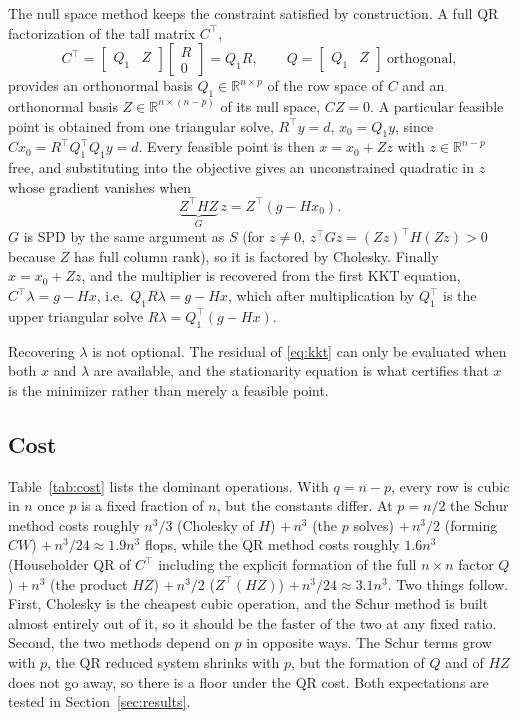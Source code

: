 \documentclass[10pt]{article}
\begin{document}
The null space method keeps the constraint satisfied by construction. A full QR
factorization of the tall matrix $C^\top$,
\begin{equation}
C^\top=\begin{bmatrix}Q_1 & Z\end{bmatrix}\begin{bmatrix}R\\0\end{bmatrix}=Q_1R,
\qquad Q=\begin{bmatrix}Q_1 & Z\end{bmatrix}\ \text{orthogonal},
\end{equation}
provides an orthonormal basis $Q_1\in\mathbb R^{n\times p}$ of the row space of $C$ and an
orthonormal basis $Z\in\mathbb R^{n\times(n-p)}$ of its null space, $CZ=0$. A particular
feasible point is obtained from one triangular solve, $R^\top y=d$, $x_0=Q_1y$, since
$Cx_0=R^\top Q_1^\top Q_1y=d$. Every feasible point is then $x=x_0+Zz$ with
$z\in\mathbb R^{n-p}$ free, and substituting into the objective gives an unconstrained
quadratic in $z$ whose gradient vanishes when
\begin{equation}\label{eq:reduced}
\underbrace{Z^\top HZ}_{G}\,z = Z^\top(g-Hx_0).
\end{equation}
$G$ is SPD by the same argument as $S$ (for $z\ne0$, $z^\top Gz=(Zz)^\top H(Zz)>0$ because
$Z$ has full column rank), so it is factored by Cholesky. Finally $x=x_0+Zz$, and the
multiplier is recovered from the first KKT equation, $C^\top\lambda=g-Hx$, i.e.\
$Q_1R\lambda=g-Hx$, which after multiplication by $Q_1^\top$ is the upper triangular
solve $R\lambda=Q_1^\top(g-Hx)$.

Recovering $\lambda$ is not optional. The residual of \eqref{eq:kkt} can only be
evaluated when both $x$ and $\lambda$ are available, and the stationarity equation is
what certifies that $x$ is the minimizer rather than merely a feasible point.

\subsection{Cost}

Table~\ref{tab:cost} lists the dominant operations. With $q=n-p$, every row is cubic in
$n$ once $p$ is a fixed fraction of $n$, but the constants differ. At $p=n/2$ the Schur
method costs roughly $n^3/3$ (Cholesky of $H$) $+\,n^3$ (the $p$ solves) $+\,n^3/2$
(forming $CW$) $+\,n^3/24\approx1.9n^3$ flops, while the QR method costs roughly
$1.6n^3$ (Householder QR of $C^\top$ including the explicit formation of the full
$n\times n$ factor $Q$) $+\,n^3$ (the product $HZ$) $+\,n^3/2$ ($Z^\top(HZ)$)
$+\,n^3/24\approx3.1n^3$. Two things follow. First, Cholesky is the cheapest cubic
operation, and the Schur method is built almost entirely out of it, so it should be the
faster of the two at any fixed ratio. Second, the two methods depend on $p$ in opposite
ways. The Schur terms grow with $p$, the QR reduced system shrinks with $p$, but the
formation of $Q$ and of $HZ$ does not go away, so there is a floor under the QR cost.
Both expectations are tested in Section~\ref{sec:results}.
\end{document}
